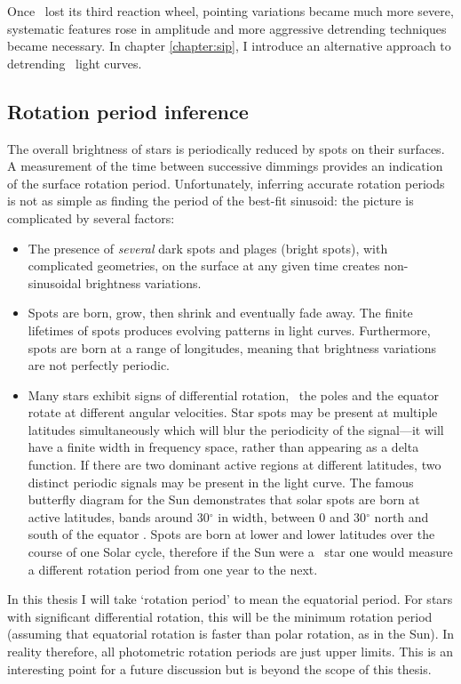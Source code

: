 Once \kepler\ lost its third reaction wheel, pointing variations became much
more severe, systematic features rose in amplitude and more aggressive
detrending techniques became necessary.
In chapter \ref{chapter:sip}, I introduce an alternative approach to
detrending \ktwo\ light curves.

\subsection{Rotation period inference}
\label{sec:rotation}
The overall brightness of stars is periodically reduced by spots on their
surfaces.
A measurement of the time between successive dimmings provides an indication
of the surface rotation period.
Unfortunately, inferring accurate rotation periods is not as simple as finding
the period of the best-fit sinusoid: the picture is complicated by several
factors:
\begin{itemize}
\item{The presence of {\it several} dark spots and plages (bright spots), with
complicated geometries, on the surface at any given time creates
non-sinusoidal brightness variations.}
\item{Spots are born, grow, then shrink and eventually fade away.
The finite lifetimes of spots produces evolving patterns in light curves.
Furthermore, spots are born at a range of longitudes, meaning that brightness
variations are not perfectly periodic.}
\item{Many stars exhibit signs of differential rotation, \ie\ the poles and
the equator rotate at different angular velocities.
Star spots may be present at multiple latitudes simultaneously which will blur
the periodicity of the signal---it will have a finite width in frequency
space, rather than appearing as a delta function.
If there are two dominant active regions at different latitudes, two distinct
periodic signals may be present in the light curve.
The famous butterfly diagram for the Sun demonstrates that solar spots are
born at active latitudes, bands around 30$^\circ$ in width, between 0 and
30$^\circ$ north and south of the equator \citep[\eg][]{Charbonneau2010}.
Spots are born at lower and lower latitudes over the course of one Solar
cycle, therefore if the Sun were a \kepler\
star one would measure a different rotation period from one year to the next.
}
\end{itemize}

In this thesis I will take `rotation period' to mean the equatorial period.
For stars with significant differential rotation, this will be the minimum
rotation period (assuming that equatorial rotation is faster than polar
rotation, as in the Sun).
In reality therefore, all photometric rotation periods are just upper limits.
This is an interesting point for a future discussion but is beyond the scope
of this thesis.

